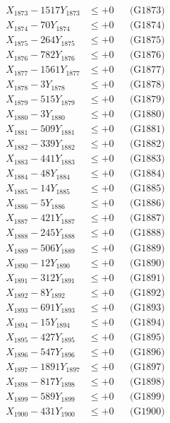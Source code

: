 \documentclass[a4paper,10pt]{article}
\begin{document}
{\begin{align}
X_{1873} - 1517Y_{1873} &\leq +0 && \text{(G1873)} \\
X_{1874} - 70Y_{1874} &\leq +0 && \text{(G1874)} \\
X_{1875} - 264Y_{1875} &\leq +0 && \text{(G1875)} \\
X_{1876} - 782Y_{1876} &\leq +0 && \text{(G1876)} \\
X_{1877} - 1561Y_{1877} &\leq +0 && \text{(G1877)} \\
X_{1878} - 3Y_{1878} &\leq +0 && \text{(G1878)} \\
X_{1879} - 515Y_{1879} &\leq +0 && \text{(G1879)} \\
X_{1880} - 3Y_{1880} &\leq +0 && \text{(G1880)} \\
\allowbreak
X_{1881} - 509Y_{1881} &\leq +0 && \text{(G1881)} \\
X_{1882} - 339Y_{1882} &\leq +0 && \text{(G1882)} \\
X_{1883} - 441Y_{1883} &\leq +0 && \text{(G1883)} \\
X_{1884} - 48Y_{1884} &\leq +0 && \text{(G1884)} \\
X_{1885} - 14Y_{1885} &\leq +0 && \text{(G1885)} \\
X_{1886} - 5Y_{1886} &\leq +0 && \text{(G1886)} \\
X_{1887} - 421Y_{1887} &\leq +0 && \text{(G1887)} \\
X_{1888} - 245Y_{1888} &\leq +0 && \text{(G1888)} \\
X_{1889} - 506Y_{1889} &\leq +0 && \text{(G1889)} \\
X_{1890} - 12Y_{1890} &\leq +0 && \text{(G1890)} \\
\allowbreak
X_{1891} - 312Y_{1891} &\leq +0 && \text{(G1891)} \\
X_{1892} - 8Y_{1892} &\leq +0 && \text{(G1892)} \\
X_{1893} - 691Y_{1893} &\leq +0 && \text{(G1893)} \\
X_{1894} - 15Y_{1894} &\leq +0 && \text{(G1894)} \\
X_{1895} - 427Y_{1895} &\leq +0 && \text{(G1895)} \\
X_{1896} - 547Y_{1896} &\leq +0 && \text{(G1896)} \\
X_{1897} - 1891Y_{1897} &\leq +0 && \text{(G1897)} \\
X_{1898} - 817Y_{1898} &\leq +0 && \text{(G1898)} \\
X_{1899} - 589Y_{1899} &\leq +0 && \text{(G1899)} \\
X_{1900} - 431Y_{1900} &\leq +0 && \text{(G1900)} \\

\end{align}}
\end{document}

